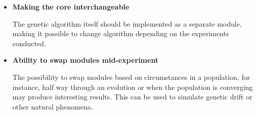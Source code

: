 \begin{itemize}
	\item\textbf{Making the core interchangeable}

	The genetic algorithm itself should be implemented as a separate module, making it possible to change algorithm depending on the experiments conducted.

	\item\textbf{Ability to swap modules mid-experiment}

	The possibility to swap modules based on circumstances in a population, for instance, half way through an evolution or when the population is converging may produce interesting results. This can be used to simulate genetic drift or other natural phenomena.
\end{itemize}
